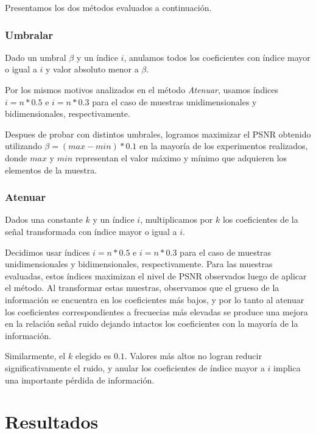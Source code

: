 \documentclass[a4paper,10pt,twoside]{article}
\begin{document}
Presentamos los dos métodos evaluados a continuación.

\subsubsection{Umbralar}
Dado un umbral $\beta$ y un índice $i$, anulamos todos los coeficientes con índice mayor o igual a $i$ y valor absoluto menor a $\beta$.

Por los mismos motivos analizados en el método \textit{Atenuar}, usamos índices $i = n * 0.5$ e $i = n * 0.3$ para el caso de muestras unidimensionales y bidimensionales, respectivamente.

Despues de probar con distintos umbrales, logramos maximizar el PSNR obtenido utilizando $\beta = (max - min) * 0.1$ en la mayoría de los experimentos realizados, donde $max$ y $min$ representan el valor máximo y mínimo que adquieren los elementos de la muestra.

\subsubsection{Atenuar}
Dados una constante $k$ y un índice $i$, multiplicamos por $k$ los coeficientes de la señal transformada con índice mayor o igual a $i$.

Decidimos usar índices $i = n * 0.5$ e $i = n * 0.3$ para el caso de muestras unidimensionales y bidimensionales, respectivamente. Para las muestras evaluadas, estos índices maximizan el nivel de PSNR observados luego de aplicar el método. Al transformar estas muestras, observamos que el grueso de la información se encuentra en los coeficientes más bajos, y por lo tanto al atenuar los coeficientes correspondientes a frecuecias más elevadas se produce una mejora en la relación señal ruido dejando intactos los coeficientes con la mayoría de la información.

Similarmente, el $k$ elegido es $0.1$. Valores más altos no logran reducir significativamente el ruido, y anular los coeficientes de índice mayor a $i$ implica una importante pérdida de información.


\section{Resultados}
\end{document}
